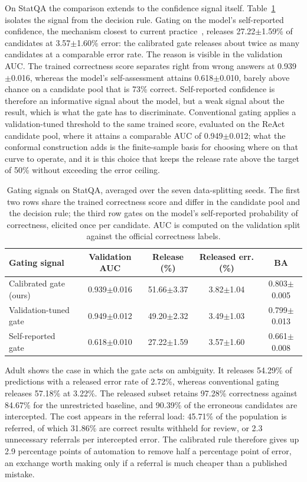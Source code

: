 \documentclass[preprint,12pt,authoryear]{elsarticle}
\begin{document}
On StatQA the comparison extends to the confidence signal itself.
Table~\ref{tab:gate_signals} isolates the signal from the decision rule.
Gating on the model's self-reported confidence, the mechanism closest to current practice~\citep{kadavath2022language}, releases 27.22$\pm$1.59\% of candidates at 3.57$\pm$1.60\% error: the calibrated gate releases about twice as many candidates at a comparable error rate.
The reason is visible in the validation AUC.
The trained correctness score separates right from wrong answers at 0.939$\pm$0.016, whereas the model's self-assessment attains 0.618$\pm$0.010, barely above chance on a candidate pool that is 73\% correct.
Self-reported confidence is therefore an informative signal about the model, but a weak signal about the result, which is what the gate has to discriminate.
Conventional gating applies a validation-tuned threshold to the same trained score, evaluated on the ReAct candidate pool, where it attains a comparable AUC of 0.949$\pm$0.012; what the conformal construction adds is the finite-sample basis for choosing where on that curve to operate, and it is this choice that keeps the release rate above the target of 50\% without exceeding the error ceiling.

\begin{table}[t]
\centering
\scriptsize
\caption{Gating signals on StatQA, averaged over the seven data-splitting seeds. The first two rows share the trained correctness score and differ in the candidate pool and the decision rule; the third row gates on the model's self-reported probability of correctness, elicited once per candidate. AUC is computed on the validation split against the official correctness labels.}
\label{tab:gate_signals}
\setlength{\tabcolsep}{3pt}
\begin{tabularx}{\linewidth}{@{}Xcccc@{}}
\toprule
\textbf{Gating signal} & \textbf{Validation AUC} & \textbf{Release (\%)} & \textbf{Released err. (\%)} & \textbf{BA}\\
\midrule
Calibrated gate (ours) & 0.939$\pm$0.016 & 51.66$\pm$3.37 & 3.82$\pm$1.04 & 0.803$\pm$0.005\\
Validation-tuned gate & 0.949$\pm$0.012 & 49.20$\pm$2.32 & 3.49$\pm$1.03 & 0.799$\pm$0.013\\
Self-reported gate & 0.618$\pm$0.010 & 27.22$\pm$1.59 & 3.57$\pm$1.60 & 0.661$\pm$0.008\\
\bottomrule
\end{tabularx}
\end{table}

Adult shows the case in which the gate acts on ambiguity.
It releases 54.29\% of predictions with a released error rate of 2.72\%, whereas conventional gating releases 57.18\% at 3.22\%.
The released subset retains 97.28\% correctness against 84.67\% for the unrestricted baseline, and 90.39\% of the erroneous candidates are intercepted.
The cost appears in the referral load: 45.71\% of the population is referred, of which 31.86\% are correct results withheld for review, or 2.3 unnecessary referrals per intercepted error.
The calibrated rule therefore gives up 2.9 percentage points of automation to remove half a percentage point of error, an exchange worth making only if a referral is much cheaper than a published mistake.
\end{document}
